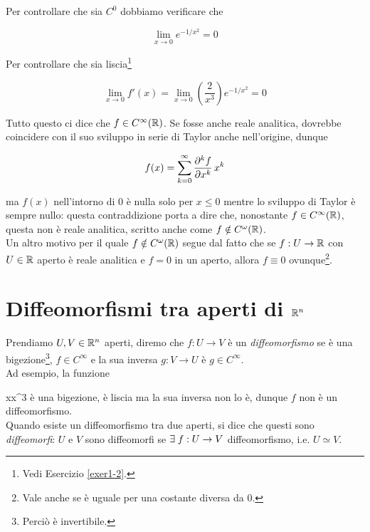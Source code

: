 Per controllare che sia $ C^{0} $ dobbiamo verificare che

\begin{equation}
	\lim_{x \to 0} e^{-1/x^{2}} = 0
\end{equation}

Per controllare che sia liscia\footnote{%
	Vedi Esercizio \ref{exer1-2}.}

\begin{equation}
	\lim_{x \to 0} f' (x) = \lim_{x \to 0} \left(\dfrac{2}{x^{3}}\right) e^{-1/x^{2}} = 0
\end{equation}

Tutto questo ci dice che $ f \in C^{\infty}(\mathbb{R}) $. Se fosse anche reale analitica, dovrebbe coincidere con il suo sviluppo in serie di Taylor anche nell'origine, dunque

\begin{align}
	\begin{split}
		f(x) = \sum_{k=0}^{\infty} \pdv[k]{f}{x} (0) \, x^{k}
	\end{split}
\end{align}

ma $ f(x) $ nell'intorno di 0 è nulla solo per $ x \leqslant 0 $ mentre lo sviluppo di Taylor è sempre nullo: questa contraddizione porta a dire che, nonostante $ f \in C^{\infty}(\mathbb{R}) $, questa non è reale analitica, scritto anche come $ f \notin C^{\omega}(\mathbb{R}) $. \\
Un altro motivo per il quale $ f \notin C^{\omega}(\mathbb{R}) $ segue dal fatto che se $ f : U \to \mathbb{R} $ con $ U \in \mathbb{R} $ aperto è reale analitica e $ f = 0 $ in un aperto, allora $ f \equiv 0 $ ovunque\footnote{%
	Vale anche se è uguale per una costante diversa da 0.}.

\section{Diffeomorfismi tra aperti di $ \mathbb{R}^{n} $}

Prendiamo $ U, V \in \mathbb{R}^{n} $ aperti, diremo che $ f : U \to V $ è un \textit{diffeomorfismo} se è una bigezione\footnote{%
	Perciò è invertibile.%
}, $ f \in C^{\infty} $ e la sua inversa $ g : V \to U $ è  $ g \in C^{\infty} $. \\
Ad esempio, la funzione

	{\R}{\R}
	{x}{x^{3}}
è una bigezione, è liscia ma la sua inversa non lo è, dunque $ f $ non è un diffeomorfismo. \\
Quando esiste un diffeomorfismo tra due aperti, si dice che questi sono \textit{diffeomorfi}: $ U $ e $ V $ sono diffeomorfi se $ \exists \; f : U \to V $ diffeomorfismo, i.e. $ U \simeq V $. \\


